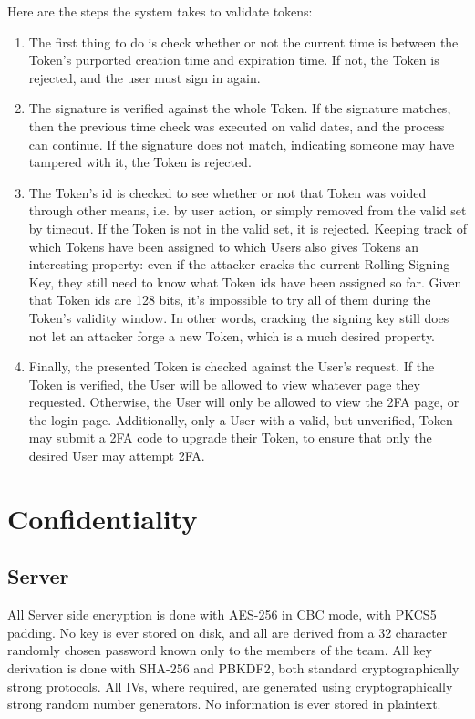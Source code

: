 \documentclass{article}
\begin{document}
\par Here are the steps the system takes to validate tokens:
\begin{enumerate}[1.]
  \item The first thing to do is check whether or not the current time is between the Token's purported creation time and expiration time. If not, the Token is rejected, and the user must sign in again.
  \item The signature is verified against the whole Token. If the signature matches, then the previous time check was executed on valid dates, and the process can continue. If the signature does not match, indicating someone may have tampered with it, the Token is rejected.
  \item The Token's id is checked to see whether or not that Token was voided through other means, i.e. by user action, or simply removed from the valid set by timeout. If the Token is not in the valid set, it is rejected. Keeping track of which Tokens have been assigned to which Users also gives Tokens an interesting property: even if the attacker cracks the current Rolling Signing Key, they still need to know what Token ids have been assigned so far. Given that Token ids are 128 bits, it's impossible to try all of them during the Token's validity window. In other words, cracking the signing key still does not let an attacker forge a new Token, which is a much desired property.
  \item Finally, the presented Token is checked against the User's request. If the Token is verified, the User will be allowed to view whatever page they requested. Otherwise, the User will only be allowed to view the 2FA page, or the login page. Additionally, only a User with a valid, but unverified, Token may submit a 2FA code to upgrade their Token, to ensure that only the desired User may attempt 2FA.
\end{enumerate}

\section{Confidentiality}
\subsection{Server}
\par All Server side encryption is done with AES-256 in CBC mode, with PKCS5 padding. No key is ever stored on disk, and all are derived from a 32 character randomly chosen password known only to the members of the team. All key derivation is done with SHA-256 and PBKDF2, both standard cryptographically strong protocols. All IVs, where required, are generated using cryptographically strong random number generators. No information is ever stored in plaintext.
\end{document}
